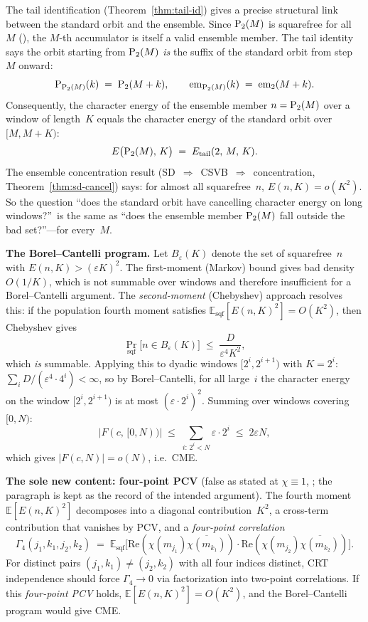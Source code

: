 \begin{remark}\label{rem:tail-dsl}
The tail identification (Theorem~\ref{thm:tail-id}) gives a precise
structural link between the standard orbit and the ensemble.  Since
$\mathrm{P}_{2}(M)$ is squarefree for all~$M$
(), the $M$-th
accumulator is itself a valid ensemble member.  The tail identity says
the orbit starting from $\mathrm{P}_{2}(M)$ \emph{is} the suffix of the
standard orbit from step~$M$ onward:
\[
  \mathrm{P}_{\mathrm{P}_{2}(M)}(k) \;=\; \mathrm{P}_{2}(M + k),
  \qquad
  \mathrm{em}_{\mathrm{P}_{2}(M)}(k) \;=\; \mathrm{em}_{2}(M + k).
\]
Consequently, the character energy of the ensemble member
$n = \mathrm{P}_{2}(M)$ over a window of length~$K$ equals the character
energy of the standard orbit over~$[M, M{+}K)$:
\[
  E\bigl(\mathrm{P}_{2}(M),\, K\bigr)
  \;=\; E_{\mathrm{tail}}(2,\, M,\, K).
\]
The ensemble concentration result
(SD~$\Rightarrow$~CSVB~$\Rightarrow$~concentration,
Theorem~\ref{thm:sd-cancel}) says: for almost all squarefree~$n$,
$E(n, K) = o(K^2)$.  So the question ``does the standard orbit have
cancelling character energy on long windows?''\ is the same as ``does
the ensemble member $\mathrm{P}_{2}(M)$ fall outside the bad set?''---for
every~$M$.

\medskip
\noindent\textbf{The Borel--Cantelli program.}\enspace
Let $B_\varepsilon(K)$ denote the set of squarefree~$n$ with
$E(n,K) > (\varepsilon K)^2$.  The first-moment (Markov) bound gives
bad density~$O(1/K)$, which is not summable over windows and
therefore insufficient for a Borel--Cantelli argument.  The
\emph{second-moment} (Chebyshev) approach resolves this: if the
population fourth moment satisfies
$\mathbb{E}_{\mathrm{sqf}}[E(n,K)^2] = O(K^2)$, then Chebyshev
gives
\[
  \Pr_{\mathrm{sqf}}\bigl[n \in B_\varepsilon(K)\bigr]
  \;\leq\; \frac{D}{\varepsilon^4 K^2},
\]
which \emph{is} summable.  Applying this to dyadic windows
$[2^i, 2^{i+1})$ with $K = 2^i$:
$\sum_i D/(\varepsilon^4 \cdot 4^i) < \infty$, so by
Borel--Cantelli, for all large~$i$ the character energy on the window
$[2^i, 2^{i+1})$ is at most $(\varepsilon \cdot 2^i)^2$.  Summing
over windows covering~$[0,N)$:
\[
  |F(c,\,[0,N))| \;\leq\;
  \sum_{i:\, 2^i < N} \varepsilon \cdot 2^i
  \;\leq\; 2\varepsilon N,
\]
which gives $|F(c,N)| = o(N)$, i.e.\ CME.

\medskip
\noindent\textbf{The sole new content: four-point PCV} (false as stated at $\chi\equiv 1$,
; the paragraph is kept as the record of the
intended argument).\enspace
The fourth moment $\mathbb{E}[E(n,K)^2]$ decomposes into a diagonal
contribution~$K^2$, a cross-term contribution that vanishes by PCV,
and a \emph{four-point correlation}
\[
  \Gamma_4(j_1,k_1,j_2,k_2)
  \;=\; \mathbb{E}_{\mathrm{sqf}}\bigl[
    \mathrm{Re}(\chi(m_{j_1})\overline{\chi(m_{k_1})})
    \cdot
    \mathrm{Re}(\chi(m_{j_2})\overline{\chi(m_{k_2})})
  \bigr].
\]
For distinct pairs $(j_1,k_1) \neq (j_2,k_2)$ with all four indices
distinct, CRT independence should force $\Gamma_4 \to 0$ via
factorization into two-point correlations.  If this \emph{four-point
PCV} holds, $\mathbb{E}[E(n,K)^2] = O(K^2)$, and the
Borel--Cantelli program would give CME\@.


\end{remark}
